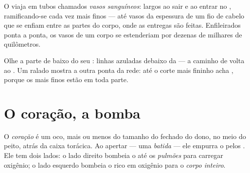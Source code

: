 \begin{definition}\label{def:g4:heart-and-blood:vessels}
O  viaja em tubos chamados \emph{vasos sanguíneos}: largos ao sair e ao entrar no , ramificando-se
cada vez mais finos --- até vasos da espessura de um fio de cabelo
que se enfiam entre as partes do corpo, onde as entregas são feitas.
Enfileirados ponta a ponta, os vasos de um corpo se estenderiam por
dezenas de milhares de quilômetros.
\end{definition}

\begin{remark}\label{rem:g4:heart-and-blood:see}
Olhe a parte de baixo do seu : linhas azuladas debaixo da 
---  a caminho de volta ao . Um 
ralado mostra a outra ponta da rede: até o corte mais fininho acha
, porque os  mais finos estão em toda parte.
\end{remark}

\section{O coração, a bomba}

\begin{definition}[O coração]\label{def:g4:heart-and-blood:heart}
O \emph{coração} é um  oco, mais ou menos do
tamanho do  fechado do dono, no meio do peito, atrás da caixa
torácica. Ao apertar --- uma \emph{batida}
--- ele empurra o  pelos . Ele tem dois lados: o lado
direito bombeia o  até os \emph{pulmões} para carregar
oxigênio; o lado esquerdo bombeia o  rico em oxigênio para o
\emph{corpo inteiro}.
\end{definition}

